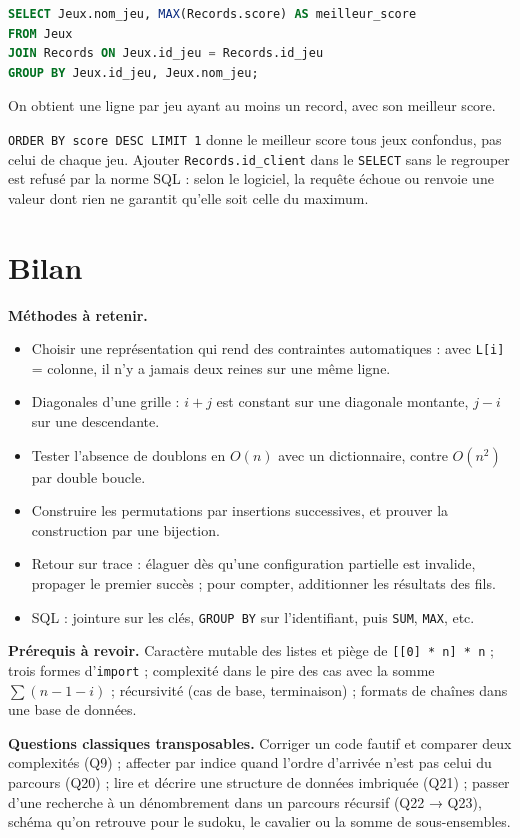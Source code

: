 \documentclass[11pt,a4paper]{article}
\providecommand{\tightlist}{\setlength{\itemsep}{0pt}\setlength{\parskip}{0pt}}
\begin{document}
\begin{lstlisting}[language=SQL]
SELECT Jeux.nom_jeu, MAX(Records.score) AS meilleur_score
FROM Jeux
JOIN Records ON Jeux.id_jeu = Records.id_jeu
GROUP BY Jeux.id_jeu, Jeux.nom_jeu;
\end{lstlisting}

On obtient une ligne par jeu ayant au moins un record, avec son meilleur score.

\begin{piege}

\texttt{ORDER\ BY\ score\ DESC\ LIMIT\ 1} donne le meilleur score tous jeux confondus, pas celui de chaque jeu. Ajouter \texttt{Records.id\_client} dans le \texttt{SELECT} sans le regrouper est refusé par la norme SQL : selon le logiciel, la requête échoue ou renvoie une valeur dont rien ne garantit qu'elle soit celle du maximum.

\end{piege}

\hypertarget{bilan}{%
\section{Bilan}\label{bilan}}

\textbf{Méthodes à retenir.}

\begin{itemize}
\tightlist
\item
  Choisir une représentation qui rend des contraintes automatiques : avec \texttt{L{[}i{]}} = colonne, il n'y a jamais deux reines sur une même ligne.
\item
  Diagonales d'une grille : \(i + j\) est constant sur une diagonale montante, \(j - i\) sur une descendante.
\item
  Tester l'absence de doublons en \(O(n)\) avec un dictionnaire, contre \(O(n^2)\) par double boucle.
\item
  Construire les permutations par insertions successives, et prouver la construction par une bijection.
\item
  Retour sur trace : élaguer dès qu'une configuration partielle est invalide, propager le premier succès ; pour compter, additionner les résultats des fils.
\item
  SQL : jointure sur les clés, \texttt{GROUP\ BY} sur l'identifiant, puis \texttt{SUM}, \texttt{MAX}, etc.
\end{itemize}

\textbf{Prérequis à revoir.} Caractère mutable des listes et piège de \texttt{{[}{[}0{]}\ *\ n{]}\ *\ n} ; trois formes d'\texttt{import} ; complexité dans le pire des cas avec la somme \(\sum (n-1-i)\) ; récursivité (cas de base, terminaison) ; formats de chaînes dans une base de données.

\textbf{Questions classiques transposables.} Corriger un code fautif et comparer deux complexités (Q9) ; affecter par indice quand l'ordre d'arrivée n'est pas celui du parcours (Q20) ; lire et décrire une structure de données imbriquée (Q21) ; passer d'une recherche à un dénombrement dans un parcours récursif (Q22 → Q23), schéma qu'on retrouve pour le sudoku, le cavalier ou la somme de sous-ensembles.
\end{document}
